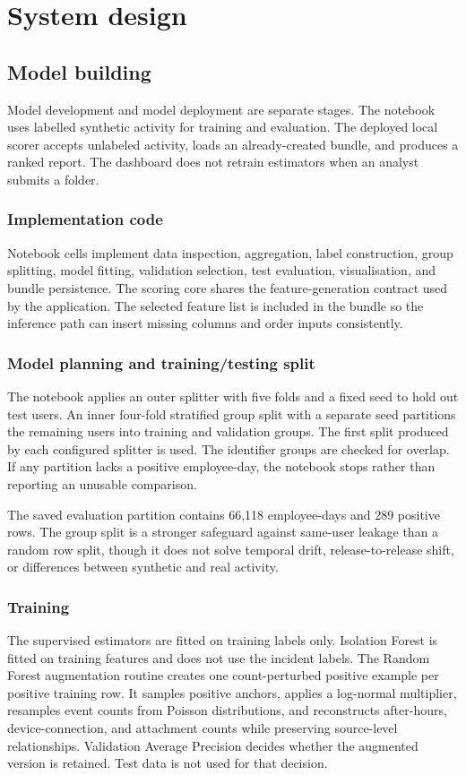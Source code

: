\chapter{System design}
\label{chap:design}

\section{Model building}
Model development and model deployment are separate stages. The
notebook uses labelled synthetic activity for training and
evaluation. The deployed local scorer accepts unlabeled activity,
loads an already-created bundle, and produces a ranked report. The
dashboard does not retrain estimators when an analyst submits a folder.

\subsection{Implementation code}
Notebook cells implement data inspection, aggregation, label
construction, group splitting, model fitting, validation selection,
test evaluation, visualisation, and bundle persistence. The scoring
core shares the feature-generation contract used by the application.
The selected feature list is included in the bundle so the inference
path can insert missing columns and order inputs consistently.

\subsection{Model planning and training/testing split}
The notebook applies an outer  splitter with
five folds and a fixed seed to hold out test users. An inner
four-fold stratified group split with a separate seed partitions the
remaining users into training and validation groups. The first
split produced by each configured splitter is used. The identifier
groups are checked for overlap. If any partition lacks a positive
employee-day, the notebook stops rather than reporting an unusable
comparison.

The saved evaluation partition contains 66,118 employee-days and 289
positive rows. The group split is a stronger safeguard against
same-user leakage than a random row split, though it does not solve
temporal drift, release-to-release shift, or differences between
synthetic and real activity.

\subsection{Training}
The supervised estimators are fitted on training labels only.
Isolation Forest is fitted on training features and does not use the
incident labels. The Random Forest augmentation routine creates one
count-perturbed positive example per positive training row. It samples
positive anchors, applies a log-normal multiplier, resamples event
counts from Poisson distributions, and reconstructs after-hours,
device-connection, and attachment counts while preserving
source-level relationships. Validation Average Precision decides
whether the augmented version is retained. Test data is not used for
that decision.

